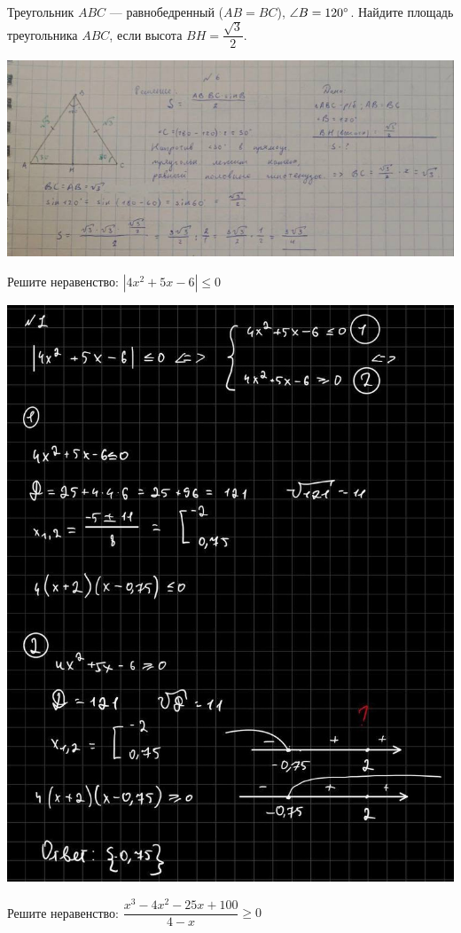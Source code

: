 \documentclass[10pt,]{article}
\begin{document}
\begin{listofex}
	\item Треугольник \( ABC \) --- равнобедренный (\( AB=BC \)), \( \angle B=120^{\circ} \). Найдите площадь треугольника \( ABC \), если высота \( BH=\dfrac{\sqrt{3}}{2} \).
	\begin{center}
		\includegraphics[align=t, width=1\linewidth]{../exercises/lists/pics/curator1}
	\end{center}
	\item Решите неравенство: \(|4x^2+5x-6|\le0\)
	\begin{center}
		\includegraphics[align=t, width=0.55\linewidth]{../exercises/lists/pics/curator2}
	\end{center}
\newpage
	\item Решите неравенство: \(\dfrac{x^3-4x^2-25x+100}{4-x}\ge0\)
	\begin{center}

\end{center}
\end{listofex}
\end{document}
